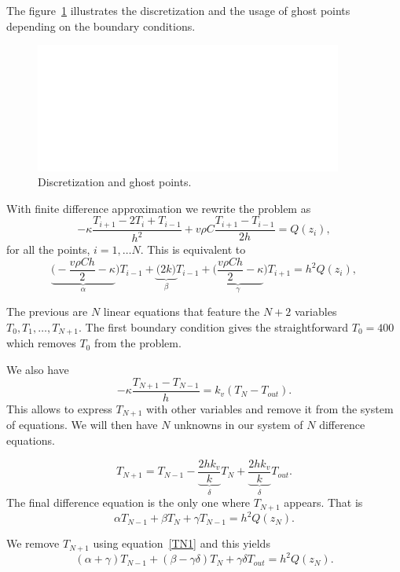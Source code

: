 \documentclass[11pt,a4paper]{report}
\begin{document}
The figure~\ref{fig:0} illustrates the discretization and the usage of ghost points depending on the boundary conditions. 

\begin{figure}[!h]
\centering
\includegraphics[width = 0.9\textwidth]{./white.png}
\caption{Discretization and ghost points.}
\label{fig:0}
\end{figure}

\FloatBarrier



With finite difference approximation we rewrite the problem as 
$$-\kappa \dfrac{T_{i+1}-2T_{i}+T_{i-1}}{h^{2}}
+ v\rho C\dfrac{T_{i+1}-T_{i-1}}{2h}=Q(z_{i}),$$
for all the points, $i=1, \dots N$. This is equivalent to
$$\underbrace{\Big(-\dfrac{v\rho Ch}{2}  -\kappa    }_{\alpha}\Big) T_{i-1} 
+ \underbrace{\Big(2k\Big)}_{\beta} T_{i-1}
+ \underbrace{\Big( \dfrac{v\rho Ch}{2}  -\kappa    }_{\gamma}\Big) T_{i+1}
=h^{2}Q(z_{i}),$$

The previous are $N$ linear equations that feature the $N+2$ variables $T_{0}, T_{1}, \dots, T_{N+1}$.
The first boundary condition gives 
the straightforward $T_{0}=400$ which removes $T_{0}$ from the problem.

We also have 
$$-\kappa \dfrac{T_{N+1}-T_{N-1}}{h}=k_{v}(T_{N}-T_{out}).$$
This allows to express $T_{N+1}$ with other variables and remove it from the system of equations. We will then have $N$ unknowns in our system of $N$ difference equations.

\begin{equation}
T_{N+1}=T_{N-1}-\underbrace{\dfrac{2hk_{v}}{k}}_{\delta} T_{N}+\underbrace{\dfrac{2hk_{v}}{k}}_{\delta}T_{out}.
\label{TN1}
\end{equation}
The final difference equation is the only one where $T_{N+1}$ appears. That is
$$\alpha T_{N-1} + \beta T_{N} + \gamma T_{N-1} =h^{2} Q(z_{N}).$$

We remove $T_{N+1}$ using equation~\ref{TN1} and this yields
$$(\alpha+\gamma) T_{N-1} + (\beta-\gamma \delta) T_{N} + \gamma \delta T_{out} = h^{2}Q(z_{N}).$$
\end{document}
